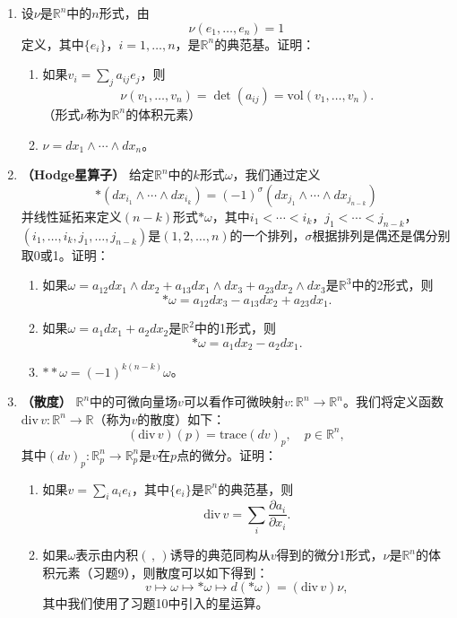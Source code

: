 \documentclass[12pt,a4paper]{ctexbook}
\begin{document}
\begin{enumerate}
    \item 设$\nu$是$\mathbb{R}^n$中的$n$形式，由
    $$\nu(e_1,\ldots,e_n) = 1$$
    定义，其中$\{e_i\}$，$i=1,\ldots,n$，是$\mathbb{R}^n$的典范基。证明：
    \begin{enumerate}
        \item 如果$v_i = \sum_j a_{ij}e_j$，则
        $$\nu(v_1,\ldots,v_n) = \det(a_{ij}) = \text{vol}(v_1,\ldots,v_n).$$
        （形式$\nu$称为$\mathbb{R}^n$的体积元素）
        \item $\nu = dx_1\wedge\cdots\wedge dx_n$。
    \end{enumerate}
    
    \item \textbf{（Hodge星算子）} 给定$\mathbb{R}^n$中的$k$形式$\omega$，我们通过定义
    $$*(dx_{i_1}\wedge\cdots\wedge dx_{i_k}) = (-1)^\sigma(dx_{j_1}\wedge\cdots\wedge dx_{j_{n-k}})$$
    并线性延拓来定义$(n-k)$形式$*\omega$，其中$i_1<\cdots<i_k$，$j_1<\cdots<j_{n-k}$，$(i_1,\ldots,i_k,j_1,\ldots,j_{n-k})$是$(1,2,\ldots,n)$的一个排列，$\sigma$根据排列是偶还是偶分别取0或1。证明：
    \begin{enumerate}
        \item 如果$\omega = a_{12}dx_1\wedge dx_2 + a_{13}dx_1\wedge dx_3 + a_{23}dx_2\wedge dx_3$是$\mathbb{R}^3$中的2形式，则
        $$*\omega = a_{12}dx_3 - a_{13}dx_2 + a_{23}dx_1.$$
        \item 如果$\omega = a_1dx_1 + a_2dx_2$是$\mathbb{R}^2$中的1形式，则
        $$*\omega = a_1dx_2 - a_2dx_1.$$
        \item $**\omega = (-1)^{k(n-k)}\omega$。
    \end{enumerate}
    
    \item \textbf{（散度）} $\mathbb{R}^n$中的可微向量场$v$可以看作可微映射$v:\mathbb{R}^n\to\mathbb{R}^n$。我们将定义函数$\text{div}\,v:\mathbb{R}^n\to\mathbb{R}$（称为$v$的散度）如下：
    $$(\text{div}\,v)(p) = \text{trace}(dv)_p,\quad p\in\mathbb{R}^n,$$
    其中$(dv)_p:\mathbb{R}_p^n\to\mathbb{R}_p^n$是$v$在$p$点的微分。证明：
    \begin{enumerate}
        \item 如果$v = \sum_i a_i e_i$，其中$\{e_i\}$是$\mathbb{R}^n$的典范基，则
        $$\text{div}\,v = \sum_i \frac{\partial a_i}{\partial x_i}.$$
        \item 如果$\omega$表示由内积$(\,,\,)$诱导的典范同构从$v$得到的微分1形式，$\nu$是$\mathbb{R}^n$的体积元素（习题9），则散度可以如下得到：
        $$v \mapsto \omega \mapsto *\omega \mapsto d(*\omega) = (\text{div}\,v)\nu,$$
        其中我们使用了习题10中引入的星运算。
    \end{enumerate}
    

\end{enumerate}
\end{document}
